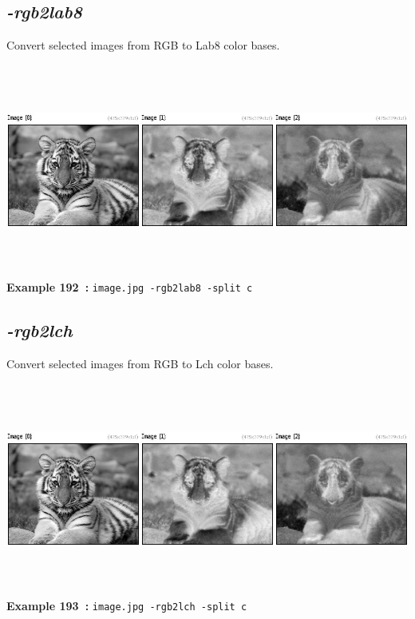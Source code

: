 \documentclass[a4paper,11pt,twoside]{book}
\begin{document}
\subsection{\emph{-rgb2lab8} }\vspace*{-0.5em}
Convert selected images from RGB to Lab8 color bases.
\begin{center}\includegraphics[keepaspectratio=true,height=7cm,width=\textwidth]{img/gmic_def192.jpg}\\
{\footnotesize \textbf{Example 192~:} \texttt{image.jpg -rgb2lab8 -split c}}
\end{center}

\subsection{\emph{-rgb2lch} }\vspace*{-0.5em}
Convert selected images from RGB to Lch color bases.
\begin{center}\includegraphics[keepaspectratio=true,height=7cm,width=\textwidth]{img/gmic_def193.jpg}\\
{\footnotesize \textbf{Example 193~:} \texttt{image.jpg -rgb2lch -split c}}
\end{center}
\end{document}
